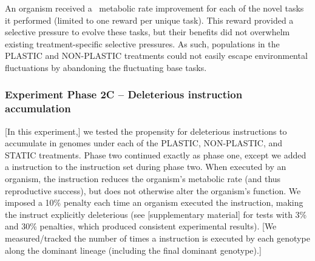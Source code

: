 An organism received a \novelTraitsReward\ metabolic rate improvement for each of the novel tasks it performed (limited to one reward per unique task).
This reward provided a selective pressure to evolve these tasks, but their benefits did not overwhelm existing treatment-specific selective pressures.
As such, populations in the PLASTIC and NON-PLASTIC treatments could not easily escape environmental fluctuations by abandoning the fluctuating base tasks.

\subsubsection{Experiment Phase 2C -- Deleterious instruction accumulation}

[In this experiment,] we tested the propensity for deleterious instructions to accumulate in genomes under each of the PLASTIC, NON-PLASTIC, and STATIC treatments.
Phase two continued exactly as phase one, except we added a  instruction to the instruction set during phase two.
When executed by an organism, the  instruction reduces the organism's metabolic rate (and thus reproductive success), but does not otherwise alter the organism's function.
We imposed a 10\% penalty each time an organism executed the  instruction, making the instruct explicitly deleterious (see [supplementary material] for tests with 3\% and 30\% penalties, which produced consistent experimental results).
[We measured/tracked the number of times a  instruction is executed by each genotype along the dominant lineage (including the final dominant genotype).]


